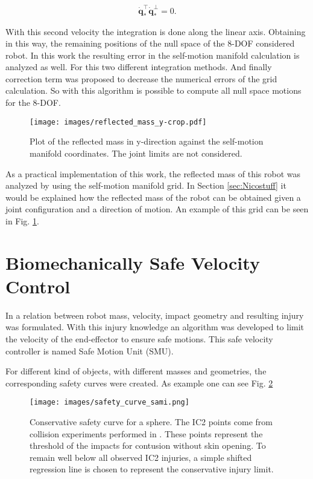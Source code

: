 \begin{equation}
\dot{\mathbf{q}}_*^\top\dot{\mathbf{q}}_*^{\bot}=0.
\label{eq:orthogonalVelocityVectors}
\end{equation}

With this second velocity the integration is done along the linear axis. Obtaining in this way, the remaining positions of the null space of the 8-DOF considered robot.
%
In this work the resulting error in the self-motion manifold calculation is analyzed as well. For this two different integration methods. And finally correction term was proposed to decrease the numerical errors of the grid calculation.  
%
So with this algorithm is possible to compute all null space motions for the 8-DOF. 


\begin{figure}[!htb]
	\centerline{
		\texttt{[image: images/reflected\_mass\_y-crop.pdf]}}
	\caption{Plot of the reflected mass in y-direction against the self-motion 		manifold coordinates. The joint limits are not considered.}
	\label{fig:reflected_mass_y-crop}
\end{figure}

As a practical implementation of this work, the reflected mass of this robot was analyzed by using the self-motion manifold grid. In Section \ref{sec:Nicostuff} it would be explained how the reflected mass of the robot can be obtained given a joint configuration and a direction of motion. 
An example of this grid can be seen in Fig.	\ref{fig:reflected_mass_y-crop}.


 

\section{Biomechanically Safe Velocity Control}
\label{sec:Samistuff}

In \cite{sammi_paper} a relation between robot mass, velocity, impact geometry
and resulting injury was formulated. With this injury knowledge an algorithm was developed to limit the velocity of the end-effector to ensure safe motions. This safe velocity controller is named Safe Motion Unit (SMU). 

For different kind of objects, with different masses and geometries, the corresponding safety curves were created. As example one can see Fig. \ref{fig:Safety_curve_paper}


\begin{figure}[htb]
	\centerline{
		\texttt{[image: images/safety\_curve\_sami.png]}}
	\caption{Conservative safety curve for a sphere. The IC2 points come from collision experiments performed in \cite{sammi_paper}. These points represent the threshold of the impacts for contusion without skin opening. To remain well below all observed IC2 injuries, a simple shifted regression line is chosen to represent the conservative injury limit.}
	\label{fig:Safety_curve_paper}
\end{figure}
 

